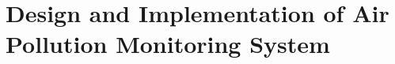 \documentclass[11pt]{article}
\begin{document}
\section*{Design and Implementation of Air Pollution Monitoring System} 



\end{document}
